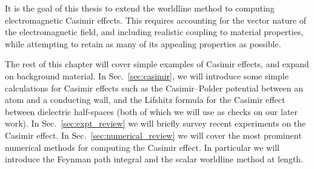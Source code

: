 It is the goal of this thesis to extend the worldline method to computing electromagnetic Casimir effects.
This requires accounting for the vector nature of the electromagnetic field, and including realistic coupling to 
material properties, while attempting to retain as many of its appealing properties as possible.    

The rest of this chapter will cover simple examples of Casimir effects, and expand on background material.
In Sec.~\ref{sec:casimir}, we will introduce some simple calculations for Casimir effects such as
the Casimir--Polder potential between an atom and a conducting wall, and the Lifshitz formula for the Casimir
effect between dielectric half-spaces (both of which we will use as checks on our later work).
In Sec.~\ref{sec:expt_review} we will briefly survey recent experiments on the Casimir effect.
In Sec.~\ref{sec:numerical_review} we will cover the most prominent numerical methods for computing the Casimir effect.
In particular we will introduce the Feynman path integral and the scalar worldline method at length.  



